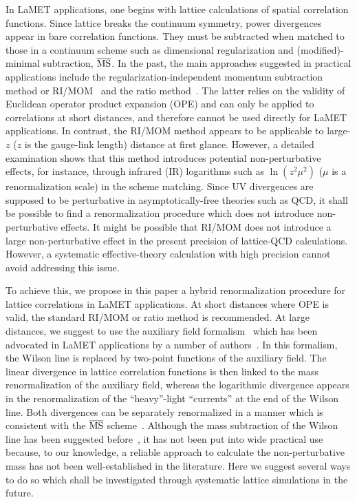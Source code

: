 In LaMET applications, one begins with lattice calculations of spatial correlation functions. Since lattice
breaks the continuum symmetry, power divergences
appear in bare correlation functions. They must be subtracted
when matched to those in a continuum scheme such as dimensional regularization
and (modified)-minimal subtraction, ${\overline {\rm MS}}$. In the past, the main
approaches suggested in practical applications include the regularization-independent momentum subtraction method
or RI/MOM~\cite{Constantinou:2017sej,Stewart:2017tvs,Alexandrou:2017huk,Chen:2017mzz} and the
ratio method~\cite{Radyushkin:2017cyf,Orginos:2017kos,Braun:2018brg,Li:2020xml}. The latter relies on
the validity of Euclidean operator product expansion (OPE) and can only be applied to
correlations at short distances, and therefore cannot be used directly for
LaMET applications.
In contrast, the RI/MOM method appears to be applicable to large-$z$ ($z$ is the gauge-link length)
distance at first glance. However, a detailed examination shows that this method introduces potential
non-perturbative effects, for instance, through infrared (IR) logarithms
such as $\ln(z^2\mu^2)$ ($\mu$ is a renormalization scale) in the scheme matching. Since UV divergences are supposed to be
perturbative in asymptotically-free theories such as QCD, it shall be possible to find a renormalization procedure which does not introduce  non-perturbative effects. It might be possible that RI/MOM does not introduce a large non-perturbative effect in the present precision
of lattice-QCD calculations. However, a systematic effective-theory
calculation with high precision cannot avoid addressing this issue.

To achieve this, we propose in this paper a hybrid renormalization procedure for lattice correlations in LaMET applications. At short distances
where OPE is valid,
the standard RI/MOM or ratio method is recommended.
At large distances, we suggest to use the auxiliary field formalism~\cite{Samuel:1978iy,Gervais:1979fv,Arefeva:1980zd,Dorn:1986dt} which has been advocated in LaMET
applications by a number of authors~\cite{Ji:2017oey,Green:2017xeu,Green:2020xco}.
In this formalism, the Wilson line is replaced by two-point functions of the auxiliary field. The linear divergence in
lattice correlation functions is then linked to the mass
renormalization of the auxiliary field, whereas the
logarithmic divergence appears in the renormalization of
the ``heavy''-light ``currents'' at the end of the Wilson line.
Both divergences can be separately renormalized in a manner which is consistent
with the $\overline{\rm MS}$ scheme~\cite{Green:2017xeu,
Green:2020xco}.  Although
the mass subtraction of the Wilson
line has been suggested before~\cite{Chen:2016fxx,Ishikawa:2017faj},
it has not been put into wide practical use because, to our knowledge,
a reliable approach to calculate the non-perturbative mass has not been well-established
in the literature. Here we suggest several ways to do so which shall be investigated through systematic
lattice simulations in the future.

